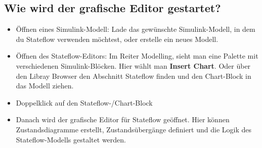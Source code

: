 \documentclass{article}
\begin{document}
\begin{multicols}{2}
		\subsection{Wie wird der grafische Editor gestartet?}
			\begin{itemize}
				\item Öffnen eines Simulink-Modell: Lade das gewünschte Simulink-Modell, in dem du Stateflow verwenden möchtest, oder erstelle ein neues Modell.
				\item Öffnen des Stateflow-Editors: Im Reiter Modelling, sieht man eine Palette mit verschiedenen Simulink-Blöcken. Hier wählt man \textbf{Insert Chart}. Oder über den Libray Browser den Abschnitt Stateflow finden und den Chart-Block in das Modell ziehen.
				\item Doppelklick auf den Stateflow-/Chart-Block
				\item Danach wird der grafische Editor für Stateflow geöffnet. Hier können Zustandsdiagramme erstellt, Zustandsübergänge definiert und die Logik des Stateflow-Modells gestaltet werden.
			\end{itemize}

\end{multicols}
\end{document}
